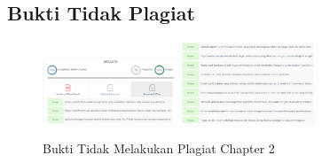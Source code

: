 \subsection{Bukti Tidak Plagiat}
\begin{figure}[H]
\centering
	\includegraphics[width=4cm]{figures/1174095/tugas2/buktiplagiat/1.PNG}
	\includegraphics[width=4cm]{figures/1174095/tugas2/buktiplagiat/2.PNG}
	\caption{Bukti Tidak Melakukan Plagiat Chapter 2}
\end{figure}

